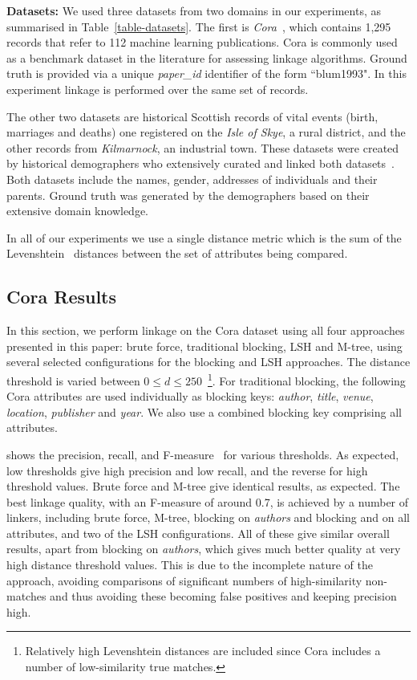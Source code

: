 \documentclass{llncs}
\begin{document}

\smallskip
\textbf{Datasets:}
\label{sec-data}
We used three datasets from two domains in our experiments, as
summarised in Table~\ref{table-datasets}. The first is
\emph{Cora}~\cite{Cora2017}, which contains 1,295 records that refer
to 112 machine learning publications. Cora is commonly used as a
benchmark dataset in the literature for assessing linkage algorithms.
Ground truth is provided via a unique \emph{paper\_id} identifier of
the form ``blum1993". In this experiment linkage is performed over
the same set of records.

The other two datasets are historical Scottish records of vital events
(birth, marriages and deaths) one registered on the \emph{Isle of
Skye}, a rural district, and the other records from
\emph{Kilmarnock}, an industrial town. These datasets were created by
historical demographers who extensively curated and linked both
datasets~\cite{reid2002,reid2006}. Both datasets include the names,
gender, addresses of individuals and their parents. Ground truth was
generated by the demographers based on their extensive domain
knowledge.

In all of our experiments we use a single distance metric which is the
sum of the Levenshtein~\cite{Levenshtein66} distances between the set
of attributes being compared.

\subsection{Cora Results}

In this section, we perform linkage on the Cora dataset using all four
approaches presented in this paper: brute force, traditional blocking,
LSH and M-tree, using several selected configurations for the blocking
and LSH approaches. The distance threshold is varied between $0 \le d \le 250$~\footnote{Relatively high Levenshtein distances are included
since Cora includes a number of low-similarity true matches.}. For
traditional blocking, the following Cora attributes are used
individually as blocking keys: \emph{author}, \emph{title},
\emph{venue}, \emph{location}, \emph{publisher} and \emph{year}. We
also use a combined blocking key comprising all attributes.

 shows the precision, recall, and F-measure~\cite{Chr12} for various thresholds. As expected, low 
thresholds give high precision and low recall, and the reverse for high
threshold values. Brute force and M-tree give identical results, as
expected. The best linkage quality, with an F-measure of around 0.7,
is achieved by a number of linkers, including brute force, M-tree, blocking on \emph{authors} and blocking and on all attributes, and two
of the LSH configurations. All of these give similar overall results,
apart from blocking on \emph{authors}, which gives much better quality
at very high distance threshold values. This is due to the incomplete
nature of the approach, avoiding comparisons of significant numbers
of high-similarity non-matches and thus avoiding these becoming false
positives and keeping precision high.
\end{document}
